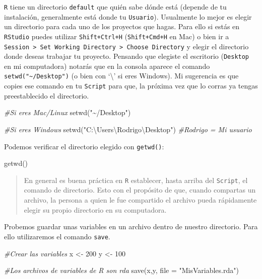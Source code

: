 \documentclass[
]{book}
\newenvironment{Shaded}{\begin{snugshade}}{\end{snugshade}}
\newcommand{\AttributeTok}[1]{\textcolor[rgb]{0.77,0.63,0.00}{#1}}
\newcommand{\CommentTok}[1]{\textcolor[rgb]{0.56,0.35,0.01}{\textit{#1}}}
\newcommand{\DecValTok}[1]{\textcolor[rgb]{0.00,0.00,0.81}{#1}}
\newcommand{\FunctionTok}[1]{\textcolor[rgb]{0.00,0.00,0.00}{#1}}
\newcommand{\NormalTok}[1]{#1}
\newcommand{\OtherTok}[1]{\textcolor[rgb]{0.56,0.35,0.01}{#1}}
\newcommand{\StringTok}[1]{\textcolor[rgb]{0.31,0.60,0.02}{#1}}
\begin{document}
\texttt{R} tiene un directorio \texttt{default} que quién sabe dónde está (depende de tu instalación, generalmente está donde tu \texttt{Usuario}). Usualmente lo mejor es elegir un directorio para cada uno de los proyectos que hagas. Para ello si estás en \texttt{RStudio} puedes utilizar \texttt{Shift+Ctrl+H} (\texttt{Shift+Cmd+H} en Mac) o bien ir a \texttt{Session\ \textgreater{}\ Set\ Working\ Directory\ \textgreater{}\ Choose\ Directory} y elegir el directorio donde deseas trabajar tu proyecto. Pensando que elegiste el escritorio (\texttt{Desktop} en mi computadora) notarás que en la consola aparece el comando \texttt{setwd("\textasciitilde{}/Desktop")} (o bien con `\textbackslash{}' si eres Windows). Mi sugerencia es que copies ese comando en tu \texttt{Script} para que, la próxima vez que lo corras ya tengas preestablecido el directorio.

\begin{Shaded}
\begin{Highlighting}[]
\CommentTok{\#Si eres Mac/Linux}
\FunctionTok{setwd}\NormalTok{(}\StringTok{"\textasciitilde{}/Desktop"}\NormalTok{) }

\CommentTok{\#Si eres Windows}
\FunctionTok{setwd}\NormalTok{(}\StringTok{"C:\textbackslash{}Users\textbackslash{}Rodrigo\textbackslash{}Desktop"}\NormalTok{) }\CommentTok{\#Rodrigo = Mi usuario}
\end{Highlighting}
\end{Shaded}

Podemos verificar el directorio elegido con \texttt{getwd()}:

\begin{Shaded}
\begin{Highlighting}[]
\FunctionTok{getwd}\NormalTok{()}
\end{Highlighting}
\end{Shaded}

\begin{quote}
En general es buena práctica en \texttt{R} establecer, hasta arriba del \texttt{Script}, el comando de directorio. Esto con el propósito de que, cuando compartas un archivo, la persona a quien le fue compartido el archivo pueda rápidamente elegir su propio directorio en su computadora.
\end{quote}

Probemos guardar unas variables en un archivo dentro de nuestro directorio. Para ello utilizaremos el comando \texttt{save}.

\begin{Shaded}
\begin{Highlighting}[]
\CommentTok{\#Crear las variables}
\NormalTok{x }\OtherTok{\textless{}{-}} \DecValTok{200}
\NormalTok{y }\OtherTok{\textless{}{-}} \DecValTok{100}

\CommentTok{\#Los archivos de variables de R son rda}
\FunctionTok{save}\NormalTok{(x,y, }\AttributeTok{file =} \StringTok{"MisVariables.rda"}\NormalTok{)}
\end{Highlighting}
\end{Shaded}
\end{document}
